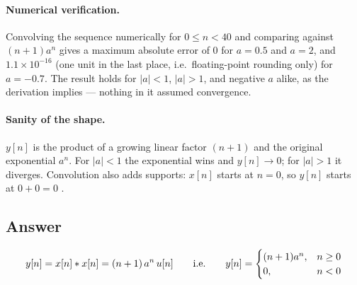 \paragraph{Numerical verification.}
Convolving the sequence numerically for $0 \le n < 40$ and comparing against
$(n+1)a^n$ gives a maximum absolute error of $0$ for $a = 0.5$ and $a = 2$, and
$1.1 \times 10^{-16}$ (one unit in the last place, i.e.\ floating-point rounding
only) for $a = -0.7$. The result holds for $|a| < 1$, $|a| > 1$, and negative
$a$ alike, as the derivation implies — nothing in it assumed convergence.

\paragraph{Sanity of the shape.} $y[n]$ is the product of a growing linear
factor $(n+1)$ and the original exponential $a^n$. For $|a| < 1$ the exponential
wins and $y[n] \to 0$; for $|a| > 1$ it diverges. Convolution also adds
supports: $x[n]$ starts at $n = 0$, so $y[n]$ starts at $0 + 0 = 0$ \checkmark.

\subsection*{Answer}

\begin{answerbox}
\begin{equation*}
  y[n] = x[n] \ast x[n] = (n+1)\,a^{n}\,u[n]
  \qquad\text{i.e.}\qquad
  y[n] = \begin{cases}
    (n+1)a^{n}, & n \ge 0 \\
    0,          & n < 0
  \end{cases}
\end{equation*}
\end{answerbox}


